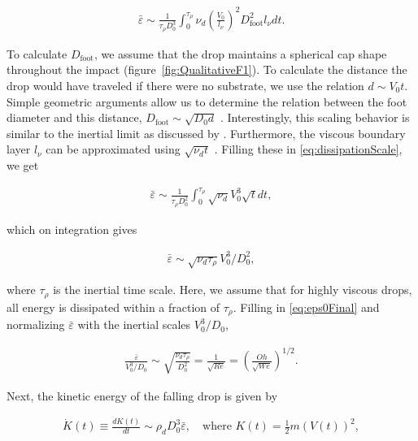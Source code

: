 \documentclass{jfm}
\begin{document}
	\begin{align}\label{eq:dissipationScale}
		\bar{\varepsilon} \sim \frac{1}{\tau_\rho D_0^3}\int_0^{\tau_\rho}\nu_d \left(\frac{V_0}{l_\nu}\right)^2 D_{\text{foot}}^2l_\nu dt.
	\end{align}
	
	\noindent To calculate $D_{\text{foot}}$, we assume that the drop maintains a spherical cap shape throughout the impact (figure~\ref{fig:QualitativeF1}). To calculate the distance the drop would have traveled if there were no substrate, we use the relation $d \sim V_0t$. Simple geometric arguments allow us to determine the relation between the foot diameter and this distance, $D_{\text{foot}} \sim \sqrt{D_0d}$ \citep{lesser1981analytic, mandre2009precursors,  zheng2021air, bilotto2023fluid, bertin2023similarity}. Interestingly, this scaling behavior is similar to the inertial limit \citep{wagner1932stoss, Bouwhuis2012, Philippi2016, gordillo2019theory} as discussed by \citet{langley2017impact, bilotto2023fluid}. Furthermore, the viscous boundary layer $l_\nu$ can be approximated using $\sqrt{\nu_d t}$ \citep{mirels1955laminar, Eggers2010, Philippi2016}. Filling these in \eqref{eq:dissipationScale}, we get
	
	\begin{align}	
		\bar{\varepsilon} \sim \frac{1}{\tau_\rho D_0^2}\int_0^{\tau_\rho}\sqrt{\nu_d} V_0^3 \sqrt{t} dt,
	\end{align}
	
	\noindent which on integration gives 
	
	\begin{align}\label{eq:eps0Final}
		\bar{\varepsilon} \sim \sqrt{\nu_d \tau_\rho}V_0^3/D_0^2, 
	\end{align}
	
	\noindent where $\tau_\rho$ is the inertial time scale. Here, we assume that for highly viscous drops, all energy is dissipated within a fraction of $\tau_\rho$. Filling in \eqref{eq:eps0Final} and normalizing $\bar{\varepsilon}$ with the inertial scales $V_0^3/D_0$,
	
	\begin{align}\label{eq:DissipationScale}
		\frac{\bar{\varepsilon}}{V_0^3/D_0} \sim \sqrt{\frac{\nu_d\tau_\rho}{D_0^2}} = \frac{1}{\sqrt{Re}} = \left(\frac{Oh}{\sqrt{We}}\right)^{1/2}.
	\end{align}
	
	\noindent Next, the kinetic energy of the falling drop is given by
	
	\begin{align}\label{eq:KEdissipation}
		\dot{K}(t) \equiv \frac{dK(t)}{dt} \sim \rho_dD_0^3\bar{\varepsilon},\quad\text{where } K(t) = \frac{1}{2}m\left(V(t)\right)^2,
	\end{align}
	
\end{document}
